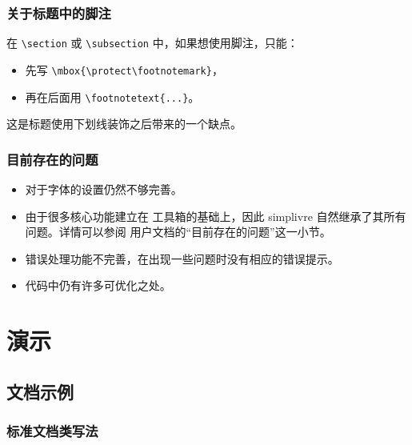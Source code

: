 \documentclass{simplivre}
\providecommand{\simplivre}{\textsf{simplivre}}
\begin{document}
\section{关于标题中的脚注}
在 \lstinline|\section| 或 \lstinline|\subsection| 中，如果想使用脚注，只能：
\begin{itemize}
    \item 先写 \lstinline|\mbox{\protect\footnotemark}|，
    \item 再在后面用 \lstinline|\footnotetext{...}|。
\end{itemize}
这是标题使用下划线装饰之后带来的一个缺点。


\section{目前存在的问题}

\begin{itemize}[itemsep=.6em]
    \item 对于字体的设置仍然不够完善。
    \item 由于很多核心功能建立在 \ProjLib{} 工具箱的基础上，因此 \simplivre{} 自然继承了其所有问题。详情可以参阅 \ProjLib{} 用户文档的“目前存在的问题”这一小节。
    \item 错误处理功能不完善，在出现一些问题时没有相应的错误提示。
    \item 代码中仍有许多可优化之处。
\end{itemize}




\part{演示}

\chapter{文档示例}

\vspace*{-1.5\baselineskip}

\section{标准文档类写法}
\end{document}
